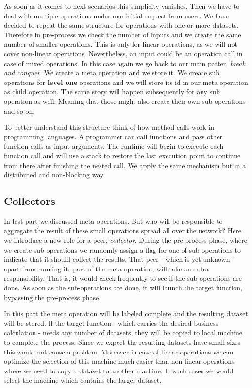As soon as it comes to next scenarios this simplicity vanishes. 
Then we have to deal with multiple operations under one initial request from users.
We have decided to repeat the same structure for operations with one or more datasets.
Therefore in pre-process we check the number of inputs and we create the same number of
smaller operations. 
This is only for linear operations, as we will not cover non-linear operations.
Nevertheless, an input could be an operation call in case of mixed operations.
In this case again we go back to our main patter, \textit{break and conquer}. 
We create a meta operation and we store it. 
We create sub operations for \textbf{level one} operations and we will store its id 
in our meta operation as child operation. 
The same story will happen subsequently for any sub operation as well. 
Meaning that those might also create their own sub-operations and so on.

To better understand this structure think of how method calls work in programming languages.
A programmer can call functions and pass other function calls as input arguments.
The runtime will begin to execute each function call and will use a stack to restore
the last execution point to continue from there after finishing the nested call.
We apply the same mechanism but in a distributed and non-blocking way.

\subsection{Collectors}
In last part we discussed meta-operations. 
But who will be responsible to aggregate the result of these small operations spread all over the network? 
Here we introduce a new role for a peer, \textit{collector}. 
During the pre-process phase, where we create sub-operations we randomly assign
a flag for one of sub-operations to indicate that it should collect the results. 
That peer - which is yet unknown - apart from running its part of the meta operation,
will take an extra responsibility. That is, it would check frequently to see if the
sub-operations are done. As soon as the sub-operations are done, it will
launch the target function, bypassing the pre-process phase.

In this part the meta operation will be labeled complete and the resulting dataset will be stored.
If the target function - which carries the desired business calculation - needs any number of datasets,
they will be copied to local machine to complete the process. 
Since we expect the resulting datasets have small sizes this would not cause a problem. 
Moreover in case of linear operations we can optimize the selection of this machine much easier than
non-linear operations where we need to copy a dataset to another machine. 
In such cases we would select the machine which contains the larger dataset.


